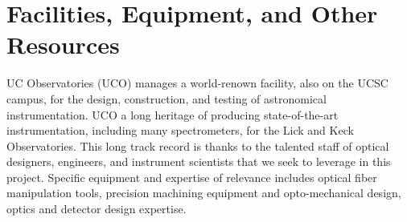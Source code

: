 \documentclass[oneside,11pt]{amsart}
\begin{document}




\clearpage




\newpage




\section{Facilities, Equipment, and Other Resources}


UC Observatories (UCO) manages a world-renown facility, also on the UCSC campus, for the design, construction, and
testing of astronomical instrumentation.  UCO a long heritage of producing state-of-the-art instrumentation, including
many spectrometers, for the Lick and Keck Observatories.  This long track record is thanks to the talented staff of
optical designers, engineers, and instrument scientists that we seek to leverage in this project.  Specific equipment
and expertise of relevance includes optical fiber manipulation tools, precision machining equipment and opto-mechanical
design, optics and detector design expertise.
\end{document}
